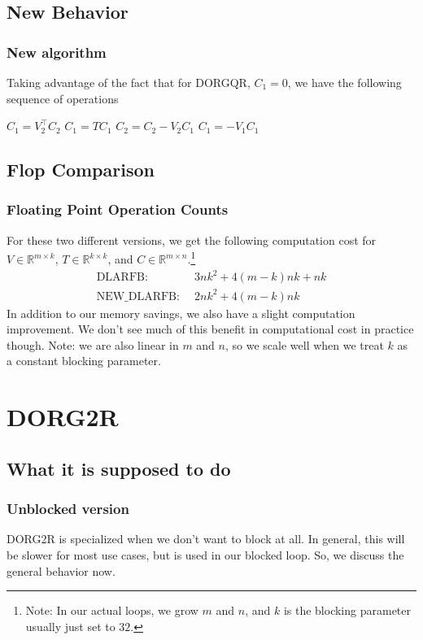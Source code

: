 \documentclass[12pt]{beamer}
\newcommand{\R}{\mathbb{R}}
\begin{document}
    \subsection{New Behavior}
    \begin{frame}
        \frametitle{New algorithm}
        Taking advantage of the fact that for DORGQR, $C_1 = 0$, we have the following sequence of operations
        \begin{algorithmic}
            \State $C_1 = V_2^\top C_2$
            \State $C_1 = TC_1$
            \State $C_2 = C_2 - V_2C_1$
            \State $C_1 =     - V_1C_1$
        \end{algorithmic}
    \end{frame}
    \subsection{Flop Comparison}
    \begin{frame}
        \frametitle{Floating Point Operation Counts}
        For these two different versions, we get the following computation cost for $V\in\R^{m\times k}$, $T\in\R^{k\times k}$, and $C\in\R^{m\times n}$.\footnote{Note: In our actual loops, we grow $m$ and $n$, and $k$ is the blocking parameter usually just set to $32$.}
        \begin{align*}
            \text{DLARFB: }&\, 3nk^2 + 4(m-k)nk + nk\\
            \text{NEW\_DLARFB: }&\, 2nk^2 + 4(m-k)nk
        \end{align*}
        In addition to our memory savings, we also have a slight computation improvement. We don't see
        much of this benefit in computational cost in practice though. Note: we are also linear in $m$ and
        $n$, so we scale well when we treat $k$ as a constant blocking parameter.
    \end{frame}
    \section{DORG2R}
    \subsection{What it is supposed to do}
    \begin{frame}
        \frametitle{Unblocked version}
        DORG2R is specialized when we don't want to block at all. In general, this will be slower for most
        use cases, but is used in our blocked loop. So, we discuss the general behavior now.
    \end{frame}
\end{document}
